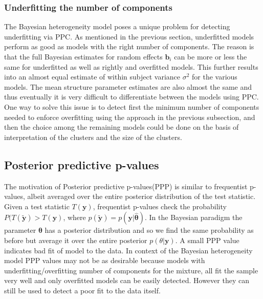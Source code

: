 \subsubsection{Underfitting the number of components}
The Bayesian heterogeneity model poses a unique problem for detecting underfitting via PPC. As mentioned in the previous section, underfitted models perform as good as models with the right number of components. The reason is that the full Bayesian estimates for random effects $\boldsymbol{b}_i$ can be more or less the same for underfitted as well as rightly and overfitted models. This further results into an almost equal estimate of within subject variance $\sigma^2$ for the various models. The mean structure parameter estimates are also almost the same and thus eventually it is very difficult to differentiate between the models using PPC. One way to solve this issue is to detect first the minimum number of components needed to enforce overfitting using the approach in the previous subsection, and then the choice among the remaining models could be done on the basis of interpretation of the clusters and the size of the clusters.
 
\subsection{Posterior predictive p-values}
The motivation of Posterior predictive p-values(PPP) is similar to frequentist p-values, albeit averaged over the entire posterior distribution of the test statistic. Given a test statistic $T(\boldsymbol{y})$, frequentist p-values check the probability $P(T(\boldsymbol{\tilde{y}}) > T(\boldsymbol{y})$, where $p(\boldsymbol{\tilde{y}}) = p(\boldsymbol{y}|\boldsymbol{\hat{\theta}})$. In the Bayesian paradigm the parameter $\boldsymbol{\theta}$ has a posterior distribution and so we find the same probability as before but average it over the entire posterior $p(\theta|\boldsymbol{y})$. A small PPP value indicates bad fit of model to the data. In context of the Bayesian heterogeneity model PPP values may not be as desirable because models with underfitting/overfitting number of components for the mixture, all fit the sample very well and only overfitted models can be easily detected. However they can still be used to detect a poor fit to the data itself.
